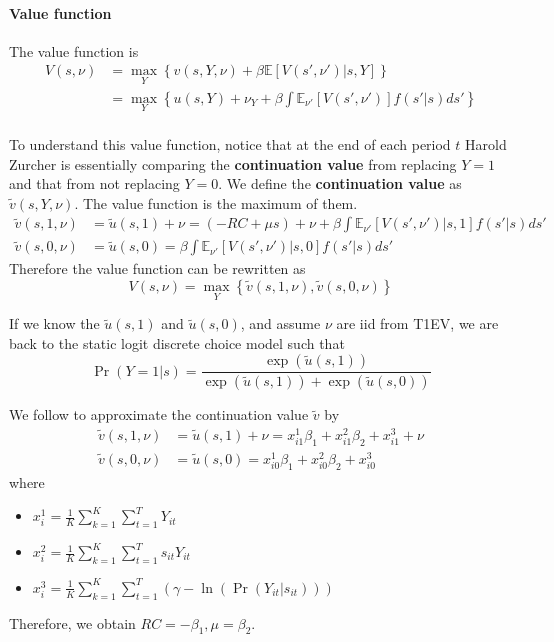 \documentclass[12pt]{article}[margin=1in]
\begin{document}
\paragraph{Value function} The value function is
\begin{equation*}
    \begin{split}
        V(s, \nu) & = \max_{Y} \left\{ v(s,Y,\nu) + \beta \mathbb{E}[V(s', \nu')|s,Y] \right\}                       \\
                  & = \max_{Y} \left\{ u(s,Y)+\nu_Y + \beta \int \mathbb{E}_{\nu'}[V(s', \nu')] f(s'|s) ds' \right\} \\
    \end{split}
\end{equation*}

To understand this value function, notice that at the end of each period $t$
Harold Zurcher is essentially comparing the \textbf{continuation value} from
replacing $Y=1$ and that from not replacing $Y=0$. We define the
\textbf{continuation value} as $\tilde{v}(s,Y,\nu)$. The value function is the
maximum of them.
\begin{align*}
    \tilde{v}(s,1,\nu) & = \tilde{u}(s,1) + \nu=  (-RC + \mu s) +\nu + \beta \int \mathbb{E}_{\nu'}[V(s', \nu')|s,1] f(s'|s) ds' \\
    \tilde{v}(s,0,\nu) & = \tilde{u}(s,0) = \beta \int \mathbb{E}_{\nu'}[V(s', \nu')|s,0] f(s'|s) ds'
\end{align*}
Therefore the value function can be rewritten as
\begin{equation*}
    V(s, \nu) = \max_Y\left\{ \tilde{v}(s,1,\nu), \tilde{v}(s,0,\nu) \right\}
\end{equation*}

If we know the $\tilde{u}(s,1)$ and $\tilde{u}(s,0)$, and assume $\nu$ are iid
from T1EV, we are back to the static logit discrete choice model such that
\begin{equation*}
    \Pr(Y=1|s) = \frac{\exp(\tilde{u}(s,1))}{\exp(\tilde{u}(s,1)) + \exp(\tilde{u}(s,0))}
\end{equation*}

We follow \citet{bajari2007estimating} to approximate the continuation value
$\tilde{v}$ by
\begin{align*}
    \tilde{v}(s,1,\nu) & = \tilde{u}(s,1) + \nu = x_{i1}^1\beta_1 + x_{i1}^2\beta_2 + x_{i1}^3+ \nu \\
    \tilde{v}(s,0,\nu) & = \tilde{u}(s,0)  = x_{i0}^1\beta_1 + x_{i0}^2\beta_2 + x_{i0}^3
\end{align*}
where
\begin{itemize}
    \item $x_{i}^1 = \frac{1}{K}\sum_{k=1}^K \sum_{t=1}^T Y_{it}$
    \item $x_{i}^2 = \frac{1}{K}\sum_{k=1}^K \sum_{t=1}^T s_{it}Y_{it}$
    \item $x_{i}^3 = \frac{1}{K}\sum_{k=1}^K \sum_{t=1}^T (\gamma-\ln(\Pr(Y_{it}|s_{it})))$
\end{itemize}
Therefore, we obtain $RC=-\beta_1, \mu=\beta_2$.
\end{document}
